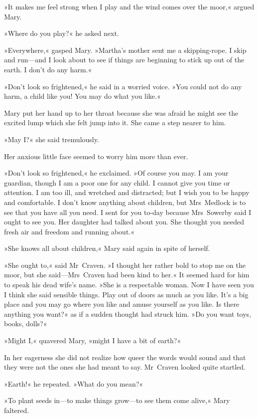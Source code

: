 »It makes me feel strong when I play and the wind comes over the moor,« argued Mary.

»Where do you play?« he asked next.

»Everywhere,« gasped Mary. »Martha's mother sent me a skipping-rope. I skip and run—and I look about to see if things are beginning to stick up out of the earth. I don't do any harm.«

»Don't look so frightened,« he said in a worried voice. »You could not do any harm, a child like you! You may do what you like.«

Mary put her hand up to her throat because she was afraid he might see the excited lump which she felt jump into it. She came a step nearer to him.

»May I?« she said tremulously.

Her anxious little face seemed to worry him more than ever.

»Don't look so frightened,« he exclaimed. »Of course you may. I am your guardian, though I am a poor one for any child. I cannot give you time or attention. I am too ill, and wretched and distracted; but I wish you to be happy and comfortable. I don't know anything about children, but Mrs~Medlock is to see that you have all you need. I sent for you to-day because Mrs~Sowerby said I ought to see you. Her daughter had talked about you. She thought you needed fresh air and freedom and running about.«

»She knows all about children,« Mary said again in spite of herself.

»She ought to,« said Mr~Craven. »I thought her rather bold to stop me on the moor, but she said—Mrs~Craven had been kind to her.« It seemed hard for him to speak his dead wife's name. »She is a respectable woman. Now I have seen you I think she said sensible things. Play out of doors as much as you like. It's a big place and you may go where you like and amuse yourself as you like. Is there anything you want?« as if a sudden thought had struck him. »Do you want toys, books, dolls?«

»Might I,« quavered Mary, »might I have a bit of earth?«

In her eagerness she did not realize how queer the words would sound and that they were not the ones she had meant to say. Mr~Craven looked quite startled.

»Earth!« he repeated. »What do you mean?«

»To plant seeds in—to make things grow—to see them come alive,« Mary faltered.


